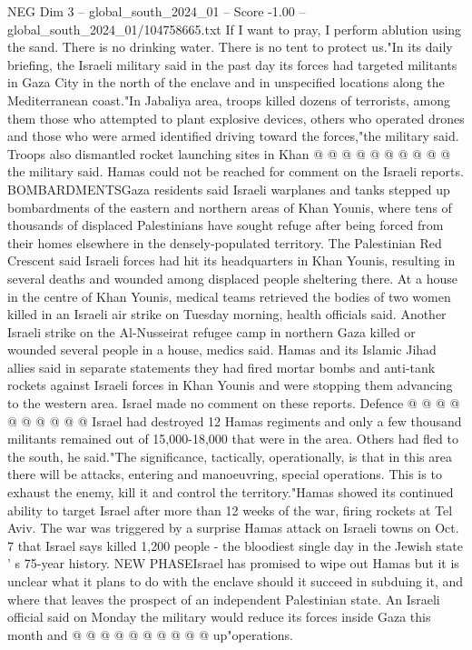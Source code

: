 \begin{textsample}{NEG Dim 3 – global\_south\_2024\_01 – Score -1.00 – global\_south\_2024\_01/104758665.txt}
If I want to pray, I perform ablution using the sand.
There is no drinking water.
There is no tent to protect us."In its daily briefing, the Israeli military said in the past day its forces had targeted militants in Gaza City in the north of the enclave and in unspecified locations along the Mediterranean coast."In Jabaliya area, troops killed dozens of terrorists, among them those who attempted to plant explosive devices, others who operated drones and those who were armed identified driving toward the forces,"the military said.
Troops also dismantled rocket launching sites in Khan @ @ @ @ @ @ @ @ @ @ the military said.
Hamas could not be reached for comment on the Israeli reports.
BOMBARDMENTSGaza residents said Israeli warplanes and tanks stepped up bombardments of the eastern and northern areas of Khan Younis, where tens of thousands of displaced Palestinians have sought refuge after being forced from their homes elsewhere in the densely-populated territory.
The Palestinian Red Crescent said Israeli forces had hit its headquarters in Khan Younis, resulting in several deaths and wounded among displaced people sheltering there.
At a house in the centre of Khan Younis, medical teams retrieved the bodies of two women killed in an Israeli air strike on Tuesday morning, health officials said.
Another Israeli strike on the Al-Nusseirat refugee camp in northern Gaza killed or wounded several people in a house, medics said.
Hamas and its Islamic Jihad allies said in separate statements they had fired mortar bombs and anti-tank rockets against Israeli forces in Khan Younis and were stopping them advancing to the western area.
Israel made no comment on these reports.
Defence @ @ @ @ @ @ @ @ @ @ Israel had destroyed 12 Hamas regiments and only a few thousand militants remained out of 15,000-18,000 that were in the area.
Others had fled to the south, he said."The significance, tactically, operationally, is that in this area there will be attacks, entering and manoeuvring, special operations.
This is to exhaust the enemy, kill it and control the territory."Hamas showed its continued ability to target Israel after more than 12 weeks of the war, firing rockets at Tel Aviv.
The war was triggered by a surprise Hamas attack on Israeli towns on Oct. 7 that Israel says killed 1,200 people - the bloodiest single day in the Jewish state ' s 75-year history.
NEW PHASEIsrael has promised to wipe out Hamas but it is unclear what it plans to do with the enclave should it succeed in subduing it, and where that leaves the prospect of an independent Palestinian state.
An Israeli official said on Monday the military would reduce its forces inside Gaza this month and @ @ @ @ @ @ @ @ @ @ up"operations.

\end{textsample}
